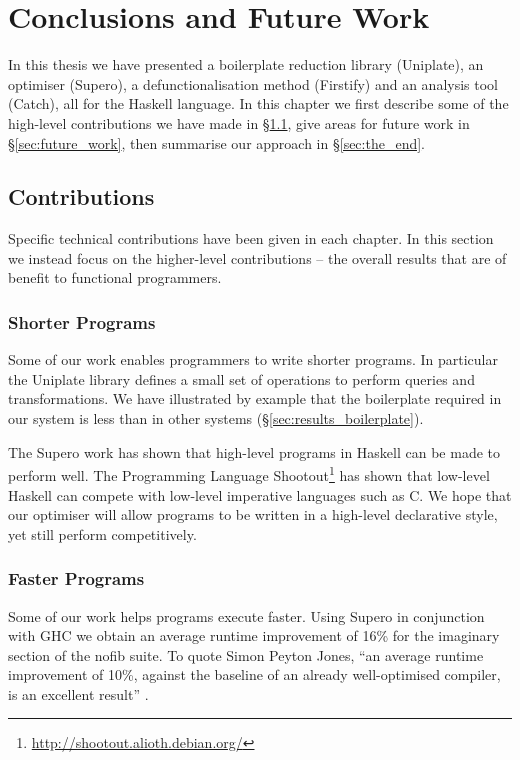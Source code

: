 
\chapter{Conclusions and Future Work}

In this thesis we have presented a boilerplate reduction library (Uniplate), an optimiser (Supero), a defunctionalisation method (Firstify) and an analysis tool (Catch), all for the Haskell language. In this chapter we first describe some of the high-level contributions we have made in \S\ref{sec:contributions}, give areas for future work in \S\ref{sec:future_work}, then summarise our approach in \S\ref{sec:the_end}.


\section{Contributions}
\label{sec:contributions}

Specific technical contributions have been given in each chapter. In this section we instead focus on the higher-level contributions -- the overall results that are of benefit to functional programmers.

\subsection{Shorter Programs}

Some of our work enables programmers to write shorter programs. In particular the Uniplate library defines a small set of operations to perform queries and transformations. We have illustrated by example that the boilerplate required in our system is less than in other systems (\S\ref{sec:results_boilerplate}).

The Supero work has shown that high-level programs in Haskell can be made to perform well. The Programming Language Shootout\footnote{\url{http://shootout.alioth.debian.org/}} has shown that low-level Haskell can compete with low-level imperative languages such as C. We hope that our optimiser will allow programs to be written in a high-level declarative style, yet still perform competitively.

\subsection{Faster Programs}

Some of our work helps programs execute faster. Using Supero in conjunction with GHC we obtain an average runtime improvement of 16\% for the imaginary section of the nofib suite. To quote Simon Peyton Jones, ``an average runtime improvement of 10\%, against the baseline of an already well-optimised compiler, is an excellent result'' \cite{spj:specconstr}.

